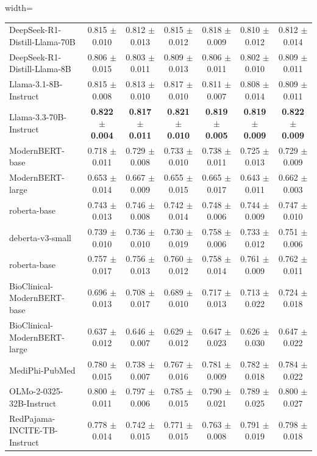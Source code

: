 \documentclass[pdflatex,sn-mathphys-num]{sn-jnl}%
\theoremstyle{thmstyleone}%
\theoremstyle{thmstyletwo}%
\theoremstyle{thmstylethree}%
\begin{document}
\begin{table}[t]
\begin{adjustbox}{width=\textwidth}
\begin{threeparttable}
\begin{tabular}{lcccccc}
DeepSeek-R1-Distill-Llama-70B     & 0.815 $\pm$ 0.010 & 0.812 $\pm$ 0.013 & 0.815 $\pm$ 0.012 & 0.818 $\pm$ 0.009 & 0.810 $\pm$ 0.012 & 0.812 $\pm$ 0.014 \\
DeepSeek-R1-Distill-Llama-8B      & 0.806 $\pm$ 0.015 & 0.803 $\pm$ 0.011 & 0.809 $\pm$ 0.013 & 0.806 $\pm$ 0.011 & 0.802 $\pm$ 0.010 & 0.809 $\pm$ 0.011 \\
Llama-3.1-8B-Instruct             & 0.815 $\pm$ 0.008 & 0.813 $\pm$ 0.010 & 0.817 $\pm$ 0.010 & 0.811 $\pm$ 0.007 & 0.808 $\pm$ 0.014 & 0.809 $\pm$ 0.011 \\
Llama-3.3-70B-Instruct            & \textbf{0.822 $\pm$ 0.004} & \textbf{0.817 $\pm$ 0.011} & \textbf{0.821 $\pm$ 0.010} & \textbf{0.819 $\pm$ 0.005} & \textbf{0.819 $\pm$ 0.009} & \textbf{0.822 $\pm$ 0.009} \\
ModernBERT-base                   & 0.718 $\pm$ 0.011 & 0.729 $\pm$ 0.008 & 0.733 $\pm$ 0.010 & 0.738 $\pm$ 0.011 & 0.725 $\pm$ 0.013 & 0.729 $\pm$ 0.009 \\
ModernBERT-large                  & 0.653 $\pm$ 0.014 & 0.667 $\pm$ 0.009 & 0.655 $\pm$ 0.015 & 0.665 $\pm$ 0.017 & 0.643 $\pm$ 0.011 & 0.662 $\pm$ 0.003 \\
roberta-base                      & 0.743 $\pm$ 0.013 & 0.746 $\pm$ 0.008 & 0.742 $\pm$ 0.014 & 0.748 $\pm$ 0.006 & 0.744 $\pm$ 0.009 & 0.747 $\pm$ 0.010 \\
deberta-v3-small                  & 0.739 $\pm$ 0.010 & 0.736 $\pm$ 0.010 & 0.730 $\pm$ 0.019 & 0.758 $\pm$ 0.006 & 0.733 $\pm$ 0.012 & 0.751 $\pm$ 0.006 \\
roberta-base                      & 0.757 $\pm$ 0.017 & 0.756 $\pm$ 0.013 & 0.760 $\pm$ 0.012 & 0.758 $\pm$ 0.014 & 0.761 $\pm$ 0.009 & 0.762 $\pm$ 0.011 \\
\midrule
BioClinical-ModernBERT-base       & 0.696 $\pm$ 0.013 & 0.708 $\pm$ 0.017 & 0.689 $\pm$ 0.010 & 0.717 $\pm$ 0.013 & 0.713 $\pm$ 0.022 & 0.724 $\pm$ 0.018 \\
BioClinical-ModernBERT-large      & 0.637 $\pm$ 0.012 & 0.646 $\pm$ 0.007 & 0.629 $\pm$ 0.012 & 0.647 $\pm$ 0.023 & 0.626 $\pm$ 0.030 & 0.647 $\pm$ 0.022 \\
MediPhi-PubMed                    & 0.780 $\pm$ 0.015 & 0.738 $\pm$ 0.007 & 0.767 $\pm$ 0.016 & 0.781 $\pm$ 0.009 & 0.782 $\pm$ 0.018 & 0.784 $\pm$ 0.022 \\
OLMo-2-0325-32B-Instruct          & 0.800 $\pm$ 0.011 & 0.797 $\pm$ 0.006 & 0.785 $\pm$ 0.015 & 0.790 $\pm$ 0.021 & 0.789 $\pm$ 0.025 & 0.800 $\pm$ 0.027 \\
RedPajama-INCITE-TB-Instruct      & 0.778 $\pm$ 0.014 & 0.742 $\pm$ 0.015 & 0.771 $\pm$ 0.015 & 0.763 $\pm$ 0.008 & 0.791 $\pm$ 0.019 & 0.798 $\pm$ 0.018 \\
\bottomrule

\end{tabular}
\end{threeparttable}
\end{adjustbox}
\end{table}
\end{document}
